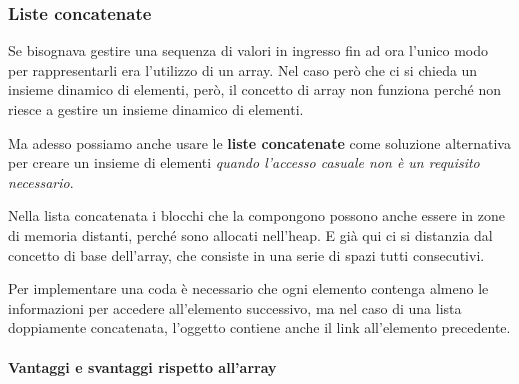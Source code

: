 \documentclass[
  paper=a4,
  oneside  ,captions=tableheading
]{scrbook}
\begin{document}
\hypertarget{liste-concatenate}{%
\subsubsection{Liste concatenate}\label{liste-concatenate}}

Se bisognava gestire una sequenza di valori in ingresso fin ad ora
l'unico modo per rappresentarli era l'utilizzo di un array. Nel caso
però che ci si chieda un insieme dinamico di elementi, però, il concetto
di array non funziona perché non riesce a gestire un insieme dinamico di
elementi.

Ma adesso possiamo anche usare le \textbf{liste concatenate} come
soluzione alternativa per creare un insieme di elementi \emph{quando
l'accesso casuale non è un requisito necessario}.

Nella lista concatenata i blocchi che la compongono possono anche essere
in zone di memoria distanti, perché sono allocati nell'heap. E già qui
ci si distanzia dal concetto di base dell'array, che consiste in una
serie di spazi tutti consecutivi.

Per implementare una coda è necessario che ogni elemento contenga almeno
le informazioni per accedere all'elemento successivo, ma nel caso di una
lista doppiamente concatenata, l'oggetto contiene anche il link
all'elemento precedente.

\hypertarget{vantaggi-e-svantaggi-rispetto-allarray}{%
\paragraph{Vantaggi e svantaggi rispetto
all'array}\label{vantaggi-e-svantaggi-rispetto-allarray}}
\end{document}
